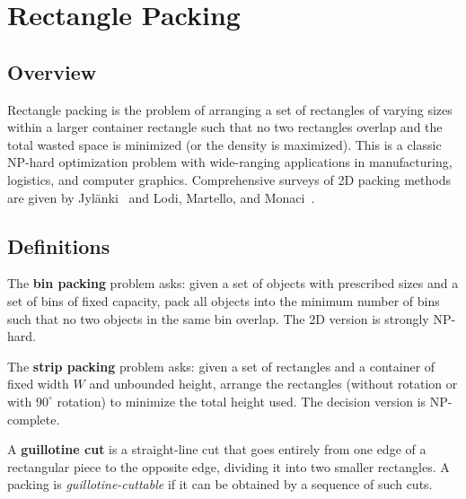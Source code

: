 \section{Rectangle Packing}
\label{sec:rectangle_packing}

\subsection{Overview}
Rectangle packing is the problem of arranging a set of rectangles of varying sizes within a larger container rectangle such that no two rectangles overlap and the total wasted space is minimized (or the density is maximized). This is a classic NP-hard optimization problem with wide-ranging applications in manufacturing, logistics, and computer graphics. Comprehensive surveys of 2D packing methods are given by Jyl\"anki~\cite{jylanki2010} and Lodi, Martello, and Monaci~\cite{lodi2002}.

\subsection{Definitions}

\begin{definition}\label{def:bin_packing}
The \textbf{bin packing} problem asks: given a set of objects with prescribed sizes and a set of bins of fixed capacity, pack all objects into the minimum number of bins such that no two objects in the same bin overlap. The 2D version is strongly NP-hard.
\end{definition}

\begin{definition}\label{def:strip_packing}
The \textbf{strip packing} problem asks: given a set of rectangles and a container of fixed width $W$ and unbounded height, arrange the rectangles (without rotation or with $90^\circ$ rotation) to minimize the total height used. The decision version is NP-complete.
\end{definition}

\begin{definition}\label{def:guillotine_cut}
A \textbf{guillotine cut} is a straight-line cut that goes entirely from one edge of a rectangular piece to the opposite edge, dividing it into two smaller rectangles. A packing is \emph{guillotine-cuttable} if it can be obtained by a sequence of such cuts.
\end{definition}

